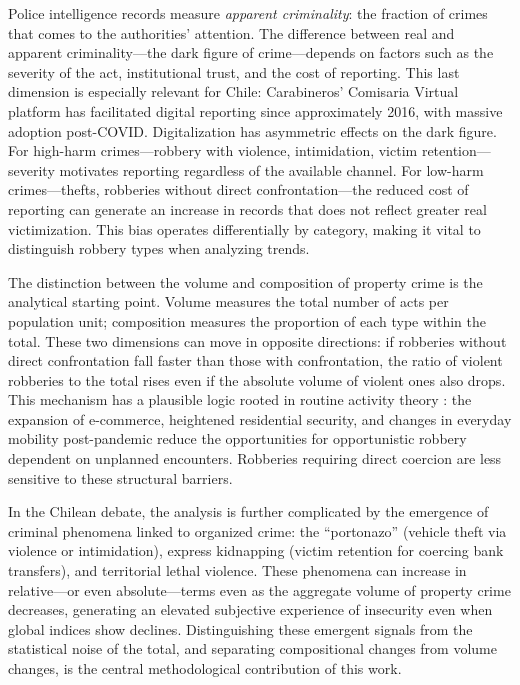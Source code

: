 \documentclass[pdflatex,sn-basic]{sn-jnl}
\begin{document}
Police intelligence records measure \emph{apparent criminality}: the fraction of
crimes that comes to the authorities' attention. The difference between real and apparent
criminality---the dark figure of crime---depends on factors such as the severity of the act,
institutional trust, and the cost of reporting. This last dimension is
especially relevant for Chile: Carabineros' Comisaria Virtual platform has
facilitated digital reporting since approximately 2016, with massive adoption
post-COVID. Digitalization has asymmetric effects on the dark figure. For
high-harm crimes---robbery with violence, intimidation, victim retention---severity
motivates reporting regardless of the available channel.
For low-harm crimes---thefts, robberies without direct confrontation---the
reduced cost of reporting can generate an increase in records that does not
reflect greater real victimization. This bias operates differentially by
category, making it vital to distinguish robbery types when analyzing trends.

The distinction between the volume and composition of property crime is the
analytical starting point. Volume measures the total number of acts per population
unit; composition measures the proportion of each type within the total. These
two dimensions can move in opposite directions: if robberies without direct confrontation
fall faster than those with confrontation, the ratio of violent robberies
to the total rises even if the absolute volume of violent ones also drops. This
mechanism has a plausible logic rooted in routine activity theory
\citep{cohen1979}: the expansion of e-commerce, heightened residential
security, and changes in everyday mobility post-pandemic reduce the
opportunities for opportunistic robbery dependent on unplanned encounters. Robberies
requiring direct coercion are less sensitive to these structural
barriers.

In the Chilean debate, the analysis is further complicated by the emergence of criminal
phenomena linked to organized crime: the ``portonazo'' (vehicle theft via
violence or intimidation), express kidnapping (victim retention for
coercing bank transfers), and territorial lethal violence. These
phenomena can increase in relative---or even absolute---terms even as the
aggregate volume of property crime decreases, generating an elevated subjective experience
of insecurity even when global indices show
declines. Distinguishing these emergent signals from the statistical noise of the total, and
separating compositional changes from volume changes, is the central methodological
contribution of this work.
\end{document}
